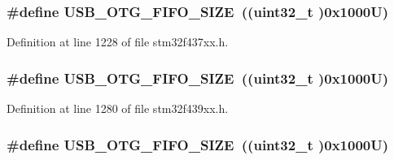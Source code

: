 \subsubsection[{\texorpdfstring{U\+S\+B\+\_\+\+O\+T\+G\+\_\+\+F\+I\+F\+O\+\_\+\+S\+I\+ZE}{USB_OTG_FIFO_SIZE}}]{\setlength{\rightskip}{0pt plus 5cm}\#define U\+S\+B\+\_\+\+O\+T\+G\+\_\+\+F\+I\+F\+O\+\_\+\+S\+I\+ZE~((uint32\+\_\+t )0x1000\+U)}\hypertarget{group___peripheral__memory__map_ga8781c4b2406c740d9fe540737a6a0188}{}\label{group___peripheral__memory__map_ga8781c4b2406c740d9fe540737a6a0188}


Definition at line 1228 of file stm32f437xx.\+h.

\subsubsection[{\texorpdfstring{U\+S\+B\+\_\+\+O\+T\+G\+\_\+\+F\+I\+F\+O\+\_\+\+S\+I\+ZE}{USB_OTG_FIFO_SIZE}}]{\setlength{\rightskip}{0pt plus 5cm}\#define U\+S\+B\+\_\+\+O\+T\+G\+\_\+\+F\+I\+F\+O\+\_\+\+S\+I\+ZE~((uint32\+\_\+t )0x1000\+U)}\hypertarget{group___peripheral__memory__map_ga8781c4b2406c740d9fe540737a6a0188}{}\label{group___peripheral__memory__map_ga8781c4b2406c740d9fe540737a6a0188}


Definition at line 1280 of file stm32f439xx.\+h.

\subsubsection[{\texorpdfstring{U\+S\+B\+\_\+\+O\+T\+G\+\_\+\+F\+I\+F\+O\+\_\+\+S\+I\+ZE}{USB_OTG_FIFO_SIZE}}]{\setlength{\rightskip}{0pt plus 5cm}\#define U\+S\+B\+\_\+\+O\+T\+G\+\_\+\+F\+I\+F\+O\+\_\+\+S\+I\+ZE~((uint32\+\_\+t )0x1000\+U)}\hypertarget{group___peripheral__memory__map_ga8781c4b2406c740d9fe540737a6a0188}{}\label{group___peripheral__memory__map_ga8781c4b2406c740d9fe540737a6a0188}


